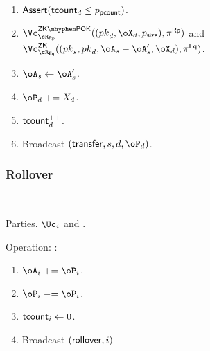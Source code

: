 \begin{protocol}
\begin{enumerate}
\begin{enumerate}
			\item  $\mathsf{Assert}(\mathsf{tcount}_d \le p_{\mathsf{pcount}})$.
				
			\item   $\vZKPOK{\rRp}((\pk_d,\oX_d,\psize),\pi^\RPs)$
			 and $\vZK{\rEq}((\pk_s,\pk_d,\oA_s- \oA_s',\oX_d),\pi^\Eqs )$. 
			
	
		
		
		     \item   $\oA_s\asn \oA_s'$. 
              
              \item  $\oP_d \pluseq X_d$. 
              
              \item $\mathsf{tcount}_d^{++}$.
              
		     
		     \item Broadcast $(\transfer,s,d,\oP_d)$.
		\end{enumerate}
		
	\end{enumerate}
	
\end{protocol}



\subsubsection{Rollover}

\begin{protocol}~\label{prot:ConfidentialTransactions:Rollover}
	\item[Parties.] $\Uc_i$ and \Cc.
	
\item[Operation:] \Cc:
	
	\begin{enumerate}
	
	\item $\oA_i  \pluseq \oP_i$.
	
	
	\item  $\oP_i \minuseq \oP_i$.
	
	\item  $\mathsf{tcount}_i \leftarrow 0$.
	
	
	\item  Broadcast $(\mathsf{rollover},i)$
	
	
\end{enumerate}
	
\end{protocol}

